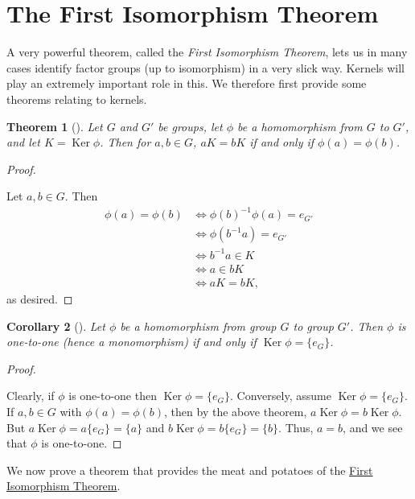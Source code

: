 \documentclass[10pt,]{book}
\theoremstyle{plain}
\newtheorem{theorem}{Theorem}[section]
\newtheorem{corollary}[theorem]{Corollary}
\theoremstyle{definition}
\theoremstyle{definition}
\theoremstyle{definition}
\theoremstyle{definition}
\numberwithin{equation}{section}
\DeclareMathOperator{\Ker}{Ker}
\newcommand{\amp}{&}
\begin{document}
\section[{The First Isomorphism Theorem}]{The First Isomorphism Theorem}\label{section-28}
A very powerful theorem, called the \emph{First Isomorphism Theorem}, lets us in many cases identify factor groups (up to isomorphism) in a very slick way. Kernels will play an extremely important role in this. We therefore first provide some theorems relating to kernels.%
\begin{theorem}[{}]\label{kermean}
Let \(G\) and \(G'\) be groups, let \(\phi\) be a homomorphism from \(G\) to \(G'\), and let \(K=\Ker \phi\). Then for \(a,b\in G\), \(aK=bK\) if and only if \(\phi(a)=\phi(b)\).%
\end{theorem}
\begin{proof}\hypertarget{proof-53}{}
Let \(a,b\in G\). Then%
\begin{align*}
\phi(a)=\phi(b)\amp \Leftrightarrow
\phi(b)^{-1}\phi(a)=e_{G'}\\
\amp \Leftrightarrow \phi(b^{-1}a)=e_{G'}\\
\amp \Leftrightarrow b^{-1}a\in K\\
\amp \Leftrightarrow a \in bK\\
\amp \Leftrightarrow aK=bK,
\end{align*}
as desired.%
\end{proof}
\begin{corollary}[{}]\label{kerone}
Let \(\phi\) be a homomorphism from group \(G\) to group \(G'\). Then \(\phi\) is one-to-one (hence a monomorphism) if and only if \(\Ker \phi=\{e_G\}\).%
\end{corollary}
\begin{proof}\hypertarget{proof-54}{}
Clearly, if \(\phi\) is one-to-one then \(\Ker \phi=\{e_G\}\). Conversely, assume \(\Ker \phi=\{e_G\}\). If \(a,b\in G\) with \(\phi(a)=\phi(b)\), then by the above theorem, \(a\Ker \phi=b\Ker
\phi\). But \(a\Ker \phi=a\{e_G\}=\{a\}\) and \(b\Ker
\phi=b\{e_G\}=\{b\}\). Thus, \(a=b\), and we see that \(\phi\) is one-to-one.%
\end{proof}
We now prove a theorem that provides the meat and potatoes of the \hyperref[fit]{First Isomorphism Theorem}.%
\end{document}

